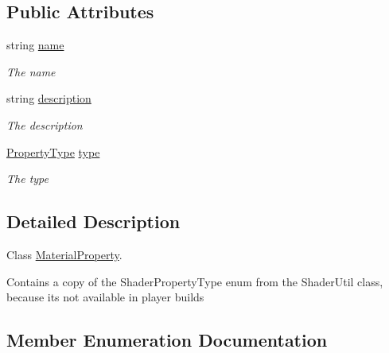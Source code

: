 \subsection*{Public Attributes}
\begin{DoxyCompactItemize}
\item 
string \hyperlink{class_serialization_1_1_store_materials_1_1_material_property_ae7bf9717cccedef01c5f1d758176dbe6}{name}
\begin{DoxyCompactList}\small\item\em The name \end{DoxyCompactList}\item 
string \hyperlink{class_serialization_1_1_store_materials_1_1_material_property_a2c4cd1fac328971d23a9ee007b67a36f}{description}
\begin{DoxyCompactList}\small\item\em The description \end{DoxyCompactList}\item 
\hyperlink{class_serialization_1_1_store_materials_1_1_material_property_ada94aa82642f597d5dc5b6d48b27da12}{Property\+Type} \hyperlink{class_serialization_1_1_store_materials_1_1_material_property_ab88a60966bb549ef386d84620823333b}{type}
\begin{DoxyCompactList}\small\item\em The type \end{DoxyCompactList}\end{DoxyCompactItemize}


\subsection{Detailed Description}
Class \hyperlink{class_serialization_1_1_store_materials_1_1_material_property}{Material\+Property}. 

Contains a copy of the Shader\+Property\+Type enum from the Shader\+Util class, because it\textquotesingle{}s not available in player builds 

\subsection{Member Enumeration Documentation}
\mbox{\label{class_serialization_1_1_store_materials_1_1_material_property_ada94aa82642f597d5dc5b6d48b27da12}} 
